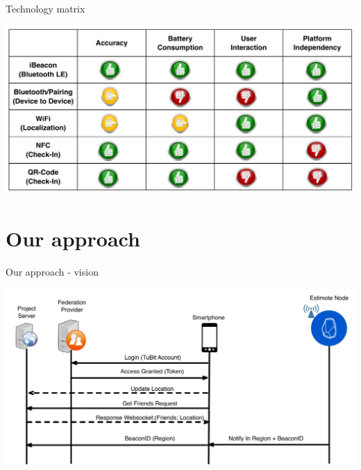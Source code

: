 \documentclass[9pt]{beamer}
\begin{document}
\begin{frame}{Technology matrix}

	\begin{center}
	
		\includegraphics[width=\textwidth]{matrix}
	
	\end{center}

\end{frame}

\section{Our approach}

\begin{frame}{Our approach - vision}

	\begin{center}

		\includegraphics[width=\textwidth]{Version2_Region_LiveLocationUpdate_2}
	
	\end{center}

\end{frame}
\end{document}
